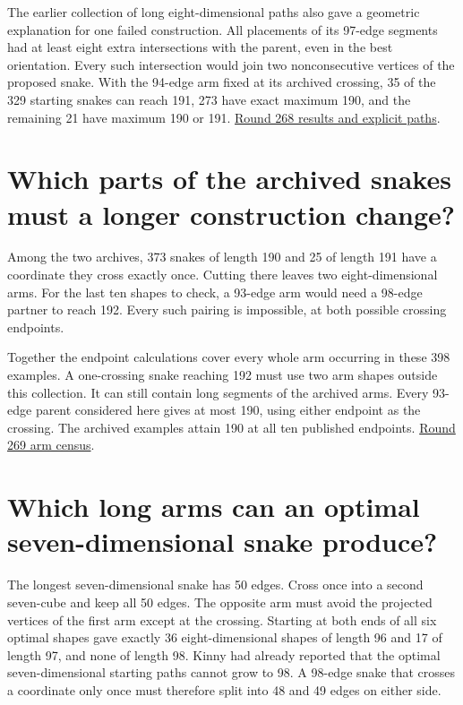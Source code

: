 \documentclass[11pt,a4paper]{article}
\begin{document}
The earlier collection of long eight-dimensional paths also gave a
geometric explanation for one failed construction. All placements of its
97-edge segments had at least eight extra intersections with the parent,
even in the best orientation. Every such intersection would join two
nonconsecutive vertices of the proposed snake.
With the 94-edge arm fixed at its archived crossing, 35 of the 329 starting snakes can reach 191, 273 have exact maximum 190, and the remaining 21 have maximum 190 or 191.
\href{https://github.com/hironaka-iori/Snake-in-the-box-in-9/tree/main/milestones/268-archived-94-arms}{Round 268 results and explicit paths}.

\section{Which parts of the archived snakes must a longer construction change?}
Among the two archives, 373 snakes of length 190 and 25 of length 191
have a coordinate they cross exactly once. Cutting there leaves two
eight-dimensional arms. For the last ten shapes to check, a 93-edge
arm would need a 98-edge partner to reach 192. Every such pairing
is impossible, at both possible crossing endpoints.

Together the endpoint calculations cover every whole arm occurring in
these 398 examples. A one-crossing snake reaching 192 must use two
arm shapes outside this collection. It can still contain long segments
of the archived arms. Every 93-edge parent considered here gives at most 190, using either endpoint as the crossing. The archived examples attain 190 at all ten published endpoints.
\href{https://github.com/hironaka-iori/Snake-in-the-box-in-9/tree/main/milestones/269-archived-93-arms}{Round 269 arm census}.

\section{Which long arms can an optimal seven-dimensional snake produce?}
The longest seven-dimensional snake has 50 edges. Cross once into a
second seven-cube and keep all 50 edges. The opposite arm must avoid
the projected vertices of the first arm except at the crossing.
Starting at both ends of all six optimal shapes gave exactly
36 eight-dimensional shapes of length 96 and 17 of length 97,
and none of length 98. Kinny had already reported that the
optimal seven-dimensional starting paths cannot grow to 98. A
98-edge snake that crosses a coordinate only
once must therefore split into 48 and 49 edges on either side.
\end{document}
